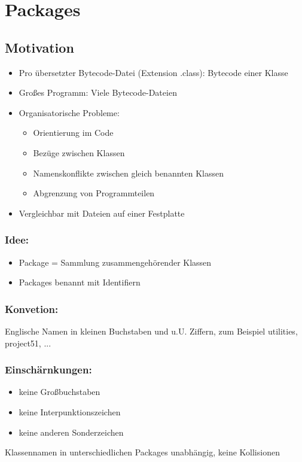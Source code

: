 \section{Packages}
\subsection{Motivation}
\begin{itemize}
\item Pro übersetzter Bytecode-Datei (Extension .class): Bytecode einer Klasse
\item Großes Programm: Viele Bytecode-Dateien
\item Organisatorische Probleme:
\begin{itemize}
\item  Orientierung im Code
\item  Bezüge zwischen Klassen
\item Namenskonflikte zwischen gleich benannten Klassen
\item  Abgrenzung von Programmteilen
\end{itemize}
\item Vergleichbar mit Dateien auf einer Festplatte
\end{itemize}
\subsubsection{Idee:}
\begin{itemize}
\item Package = Sammlung zusammengehörender Klassen
\item Packages benannt mit Identifiern
\end{itemize}
\subsubsection{Konvetion:}
Englische Namen in kleinen Buchstaben und u.U. Ziffern, zum Beispiel utilities, project51, ...
\subsubsection{Einschärnkungen:}
\begin{itemize}
\item keine Großbuchstaben
\item keine Interpunktionszeichen
\item keine anderen Sonderzeichen
\end{itemize}
Klassennamen in unterschiedlichen Packages unabhängig, keine Kollisionen

